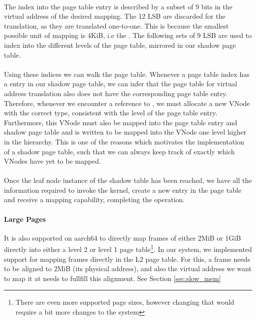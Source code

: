 \paragraph{}
The index into the page table entry is described by a subset of 9 bits in the virtual address of the desired mapping. The 12 LSB are discarded for the translation, as they are translated one-to-one. This is because the smallest possible unit of mapping is 4KiB, i.e the . The following sets of 9 LSB are used to index into the different levels of the page table, mirrored in our shadow page table.
\paragraph{}
Using these indices we can walk the page table. Whenever a page table index has a  entry in our shadow page table, we can infer that the page table for virtual address translation also does not have the corresponding page table entry. Therefore, whenever we encounter a reference to , we must allocate a new VNode with the correct type, consistent with the level of the page table entry. Furthermore, this VNode must also be mapped into the page table entry and shadow page table and is written to be mapped into the VNode one level higher in the hierarchy. This is one of the reasons which motivates the implementation of a shadow page table, such that we can always keep track of exactly which VNodes have yet to be mapped.

\paragraph{}
Once the leaf node instance of the shadow table has been reached, we have all the information required to invoke the kernel, create a new entry in the page table and receive a mapping capability, completing the operation.

\paragraph{Large Pages}
It is also supported on aarch64 to directly map frames of either 2MiB or 1GiB directly into
either a level 2 or level 1 page table\footnote{There are even more supported
page sizes, however changing that would require a bit more changes to the system}.
In our system, we implemented support for mapping frames directly in the L2 page table.
For this, a frame needs to be aligned to 2MiB (its physical address), and also the virtual
address we want to map it at needs to fullfill this alignment. See Section \ref{sec:slow_mem}



